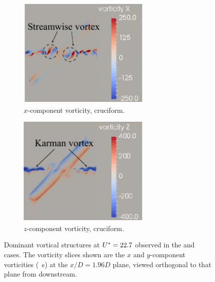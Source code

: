 \documentclass[oneside]{utmthesis}
\begin{document}
\begin{figure}
  \begin{subfigure}[h]{0.4\textwidth}
    \centering
    \includegraphics[width=0.7\textwidth]{figs/vorx45}
    \caption{$x$-component vorticity, \angth{} cruciform.}
    \label{fig:vorx45}
  \end{subfigure}
  \begin{subfigure}[h]{0.4\textwidth}
    \centering
    \includegraphics[width=0.7\textwidth]{figs/vorz45}
    \caption{$z$-component vorticity, \angth{} cruciform.}
    \label{fig:vorz45}
  \end{subfigure}

  \caption{Dominant vortical structures at $U^{*} = 22.7$ observed in the \angfo{} and \angth{} cases. The vorticity slices shown are the $x$ and $y$-component vorticities (\si{\per\second}) at the $x/D = 1.96D$ plane, viewed orthogonal to that plane from downstream.} \label{fig:vortStruct67545}
\end{figure}
\end{document}
